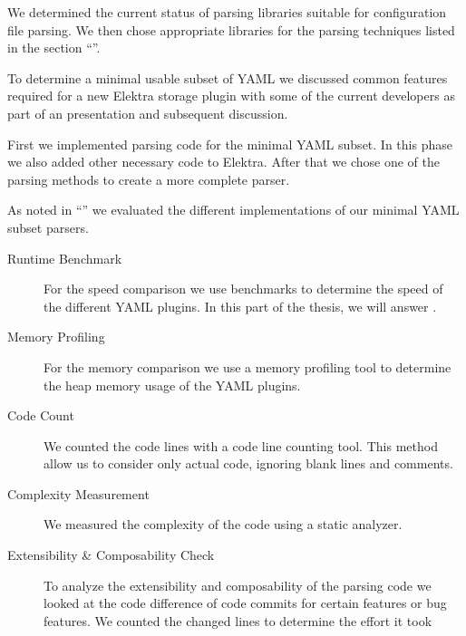 \begin{description}[style=multiline, leftmargin=3.2cm, font=\bfseries]

  \item[Literature Review] We determined the current status of parsing libraries suitable for configuration file parsing. We then chose appropriate libraries for the parsing techniques listed in the section “”.

  \item[Discussion] To determine a minimal usable subset of YAML we discussed common features required for a new Elektra storage plugin with some of the current developers as part of an presentation and subsequent discussion.

  \item[Implementation] First we implemented parsing code for the minimal YAML subset. In this phase we also added other necessary code to Elektra. After that we chose one of the parsing methods to create a more complete  parser.

  \item[Comparison] As noted in “” we evaluated the different implementations of our minimal YAML subset parsers.

  \begin{description}
    \item[Runtime Benchmark] For the speed comparison we use benchmarks to determine the speed of the different YAML plugins. In this part of the thesis, we will answer .

    \item[Memory Profiling] For the memory comparison we use a memory profiling tool to determine the heap memory usage of the YAML plugins.

    \item[Code Count] We counted the code lines with a code line counting tool. This method allow us to consider only actual code, ignoring blank lines and comments.

    \item[Complexity Measurement] We measured the complexity of the code using a static analyzer.

    \item[Extensibility & Composability Check] To analyze the extensibility and composability of the parsing code we looked at the code difference of code commits for certain features or bug features. We counted the changed lines to determine the effort it took
  \end{description}

\end{description}
